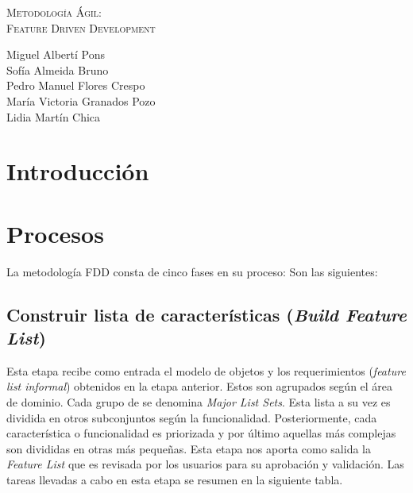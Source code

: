 \documentclass[11pt]{article}
\begin{document}
\begin{titlepage}
\centering
\vspace{4.5cm}
{\scshape\LARGE Metodología Ágil:\\ Feature Driven Development\par}
\vspace{1.5cm}


\vspace{3cm}
{\scshape\large \par}
\vspace{1cm}

{Miguel Albertí Pons\\
Sofía Almeida Bruno\\
Pedro Manuel Flores Crespo\\
María Victoria Granados Pozo\\
Lidia Martín Chica
\par}

\end{titlepage}

\thispagestyle{empty}
\tableofcontents

\newpage

\section{Introducción}

\section{Procesos}

La metodología FDD consta de cinco fases en su proceso: Son las siguientes:

\subsection {Construir lista de características (\textit{Build Feature List})}

Esta etapa recibe como entrada el modelo de objetos y los requerimientos (\textit{feature list informal}) obtenidos en la etapa anterior.  Estos son agrupados según el área de dominio. Cada grupo de se denomina \textit{Major List Sets}. Esta lista a su vez es dividida en otros subconjuntos según la funcionalidad. Posteriormente, cada característica o funcionalidad es priorizada y por último aquellas más complejas son divididas en otras más pequeñas. Esta etapa nos aporta como salida la \textit{Feature List} que es revisada por los usuarios para su aprobación y validación. Las tareas llevadas a cabo en esta etapa se resumen en la siguiente tabla. \\
\end{document}
